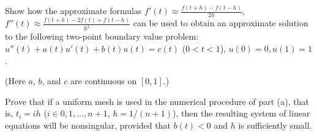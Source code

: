 \begin{alist}
\item Show how the approximate formulas $f'(t)\approx
\frac{f(t+h)-f(t-h)}{2h}$, $f''(t)\approx
\frac{f(t+h)-2f(t)+f(t-h)}{h^2}$ can be used to obtain an approximate
solution to the following two-point boundary value problem:
$u''(t)+a(t)u'(t)+b(t)u(t)=c(t)$ ($0<t<1$), $u(0)=0,u(1)=1$. 

(Here $a$, $b$, and $c$ are continuous on $[0,1]$.)
\item Prove that if a uniform mesh is used in the numerical procedure of
part (a), that is, $t_i=ih$ ($i\in 0,1,\ldots ,n+1$, $h=1/(n+1)$),
then the resulting system of linear equations will be nonsingular,
provided that $b(t)<0$ and $h$ is sufficiently small.
\end{alist}

